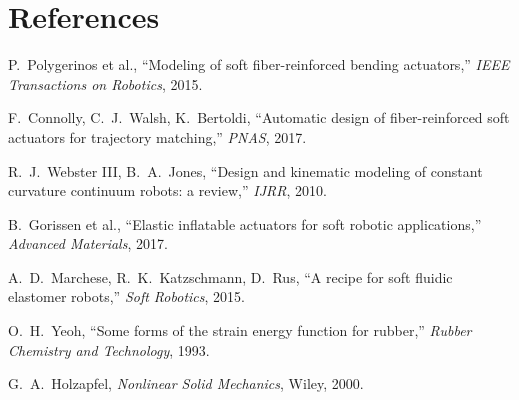 \documentclass[11pt,a4paper]{article}
\numberwithin{equation}{section}
\begin{document}
\section*{References}
\small
\begin{enumerate}[label={[\arabic*]},nosep,leftmargin=2em]
\item P.~Polygerinos et al., ``Modeling of soft fiber-reinforced bending actuators,'' \emph{IEEE Transactions on Robotics}, 2015.
\item F.~Connolly, C.~J.~Walsh, K.~Bertoldi, ``Automatic design of fiber-reinforced soft actuators for trajectory matching,'' \emph{PNAS}, 2017.
\item R.~J.~Webster III, B.~A.~Jones, ``Design and kinematic modeling of constant curvature continuum robots: a review,'' \emph{IJRR}, 2010.
\item B.~Gorissen et al., ``Elastic inflatable actuators for soft robotic applications,'' \emph{Advanced Materials}, 2017.
\item A.~D.~Marchese, R.~K.~Katzschmann, D.~Rus, ``A recipe for soft fluidic elastomer robots,'' \emph{Soft Robotics}, 2015.
\item O.~H.~Yeoh, ``Some forms of the strain energy function for rubber,'' \emph{Rubber Chemistry and Technology}, 1993.
\item G.~A.~Holzapfel, \emph{Nonlinear Solid Mechanics}, Wiley, 2000.
\end{enumerate}
\end{document}
